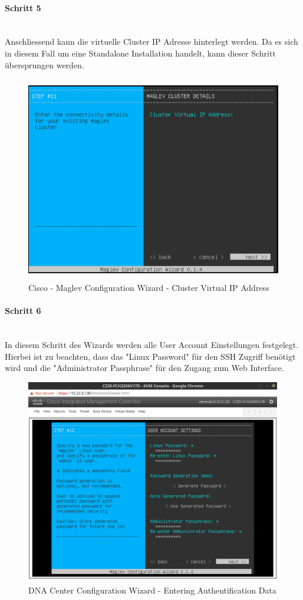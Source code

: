 \paragraph{Schritt 5}
~\\
Anschliessend kann die virtuelle Cluster IP Adresse hinterlegt werden. Da es sich in diesem Fall um eine Standalone Installation handelt, kann dieser Schritt übersprungen werden.
\begin{figure}[H]
	\centering
	\includegraphics[height=9cm]{img/installguide/installguide-step11.PNG}
	\caption{Cisco - Maglev Configuration Wizard - Cluster Virtual IP Address}
	\label{fig:installguide-dna-center-install-step-11}
\end{figure} 

\paragraph{Schritt 6}
~\\
In diesem Schritt des Wizards werden alle User Account Einstellungen festgelegt. Hierbei ist zu beachten, dass das "Linux Password" für den SSH Zugriff benötigt wird und die "Administrator Passphrase" für den Zugang zum Web Interface. 

\begin{figure}[H]
	\centering
	\includegraphics[height=9cm]{img/sc_003.png}
	\caption{DNA Center Configuration Wizard - Entering Authentification Data}
	\label{fig:installguide-dna-center-install-step-13}
\end{figure}

